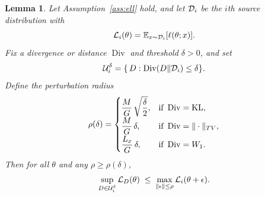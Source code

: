 \documentclass{article}
\theoremstyle{plain}
\newtheorem{lemma}[theorem]{Lemma}
\theoremstyle{definition}
\theoremstyle{remark}
\DeclareMathOperator{\Div}{Div}
\begin{document}
\begin{lemma}\label{lem:shift-perturb}
Let Assumption~\ref{ass:ell} hold, and let ${\mathcal{D}}_i$ be the $i$th source distribution with
\[
  {\mathcal{L}}_i(\theta)=\mathbb{E}_{x\sim{\mathcal{D}}_i}[\ell(\theta;x)].
\]
Fix a divergence or distance $\Div$ and threshold $\delta>0$, and set
\[
  \gU_i^\delta=\{\,D:\Div(D\|\gD_i)\le\delta\}.
\]
Define the perturbation radius
\begin{align}
  \rho(\delta)=
  \begin{cases}
    \displaystyle\frac{M}{G}\,\sqrt{\frac{\delta}{2}}, 
      &\mbox{if } \Div=\KL,\\[1ex]
    \displaystyle\frac{M}{G}\,\delta, 
      &\mbox{if } \Div=\|\cdot\|_{TV},\\[1ex]
    \displaystyle\frac{L_x}{G}\,\delta,
      &\mbox{if } \Div=W_1 .
  \end{cases}\label{eq:rho-delta}
\end{align}
Then for all $\theta$ and any $\rho\ge\rho(\delta)$,
\[
  \sup_{D\in{\mathcal{U}}_i^\delta}{\mathcal{L}}_D(\theta)
  \;\le\;
  \max_{\|{\epsilon}\|\le\rho}{\mathcal{L}}_i(\theta+{\epsilon}).
\]
\end{lemma}
\end{document}
